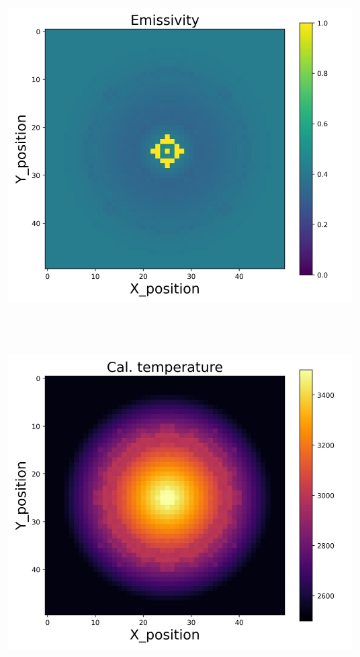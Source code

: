 \begin{figure}[htbp]
\begin{minipage}{\textwidth}
\begin{subfigure}{0.325\textwidth}
        \end{subfigure}
        \begin{subfigure}{0.325\textwidth}
            \centering
            \includegraphics[width=\textwidth]{figures/raw_data/21/T3500/lin_square/emi_cal.jpg}
        \end{subfigure}
    \end{minipage}\\
    \begin{minipage}{\textwidth}
        \centering
        \begin{subfigure}{0.325\textwidth}
            \centering
            \includegraphics[width=\textwidth]{figures/raw_data/5/T3500/lin_square/T_cal.jpg}

\end{subfigure}
\end{minipage}
\end{figure}
